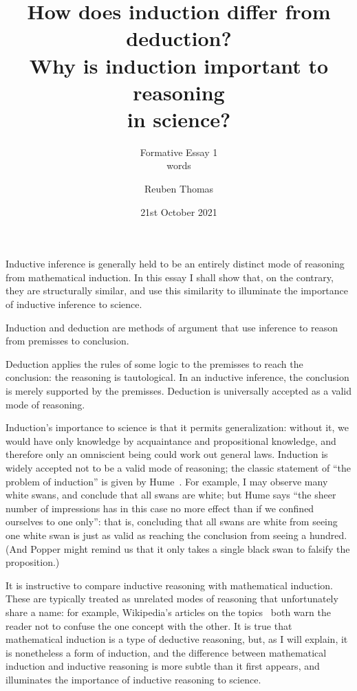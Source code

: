 \documentclass[english]{scrartcl}
\begin{document}
\title{How does induction differ from deduction?\\Why is induction important to reasoning\\in science?}
\subtitle{Formative Essay 1\\words}
\author{Reuben Thomas}
\date{21st October 2021}
\maketitle

Inductive inference is generally held to be an entirely distinct mode of reasoning from mathematical induction. In this essay I shall show that, on the contrary, they are structurally similar, and use this similarity to illuminate the importance of inductive inference to science.

Induction and deduction are methods of argument that use inference to reason from premisses to conclusion.

Deduction applies the rules of some logic to the premisses to reach the conclusion: the reasoning is tautological. In an inductive inference, the conclusion is merely supported by the premisses. Deduction is universally accepted as a valid mode of reasoning.

Induction’s importance to science is that it permits generalization: without it, we would have only knowledge by acquaintance and propositional knowledge, and therefore only an omniscient being could work out general laws. Induction is widely accepted not to be a valid mode of reasoning; the classic statement of “the problem of induction” is given by Hume~\cite{hume1978}. For example, I may observe many white swans, and conclude that all swans are white; but Hume says “the sheer number of impressions has in this case no more effect than if we confined ourselves to one only”: that is, concluding that all swans are white from seeing one white swan is just as valid as reaching the conclusion from seeing a hundred. (And Popper might remind us that it only takes a single black swan to falsify the proposition.)

It is instructive to compare inductive reasoning with mathematical induction. These are typically treated as unrelated modes of reasoning that unfortunately share a name: for example, Wikipedia’s articles on the topics~\cite{wiki:mathematical-induction,wiki:inductive-reasoning} both warn the reader not to confuse the one concept with the other. It is true that mathematical induction is a type of deductive reasoning, but, as I will explain, it is nonetheless a form of induction, and the difference between mathematical induction and inductive reasoning is more subtle than it first appears, and illuminates the importance of inductive reasoning to science.
\end{document}
